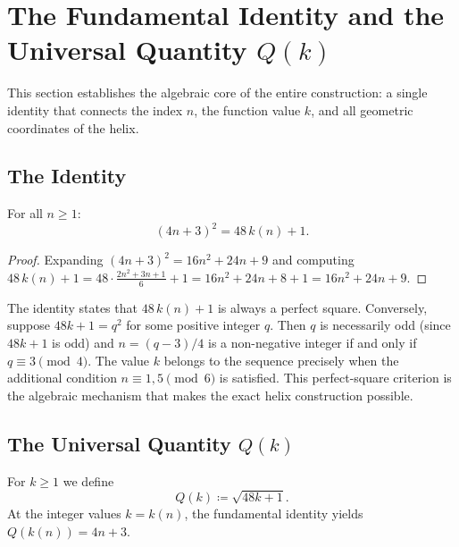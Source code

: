 \section{The Fundamental Identity and the Universal Quantity \texorpdfstring{$Q(k)$}{Q(k)}}
\label{sec:identity}

This section establishes the algebraic core of the entire construction:
a single identity that connects the index $n$, the function value $k$,
and all geometric coordinates of the helix.

\subsection{The Identity}

\begin{theorem}\label{thm:fundamental}
For all $n \geq 1$:
\begin{equation}\label{eq:fundamental}
  (4n+3)^2 = 48\,k(n) + 1.
\end{equation}
\end{theorem}

\begin{proof}
Expanding $(4n+3)^2 = 16n^2 + 24n + 9$ and computing
$48\,k(n) + 1 = 48 \cdot \frac{2n^2+3n+1}{6} + 1 = 16n^2 + 24n + 8 + 1 = 16n^2+24n+9$.
\end{proof}

\begin{remark}[Significance]
The identity states that $48\,k(n)+1$ is always a perfect square.
Conversely, suppose $48k+1 = q^2$ for some positive integer $q$.
Then $q$ is necessarily odd (since $48k+1$ is odd) and
$n = (q-3)/4$ is a non-negative integer if and only if
$q \equiv 3 \pmod{4}$. The value $k$ belongs to the sequence
precisely when the additional condition $n \equiv 1, 5 \pmod{6}$ is
satisfied. This perfect-square criterion is the algebraic mechanism
that makes the exact helix construction possible.
\end{remark}

\subsection{The Universal Quantity \texorpdfstring{$Q(k)$}{Q(k)}}

\begin{definition}\label{def:Q}
For $k \geq 1$ we define
\begin{equation}\label{eq:Q-def}
  Q(k) \coloneqq \sqrt{48k+1}.
\end{equation}
At the integer values $k = k(n)$, the fundamental identity yields
$Q(k(n)) = 4n+3$.
\end{definition}

